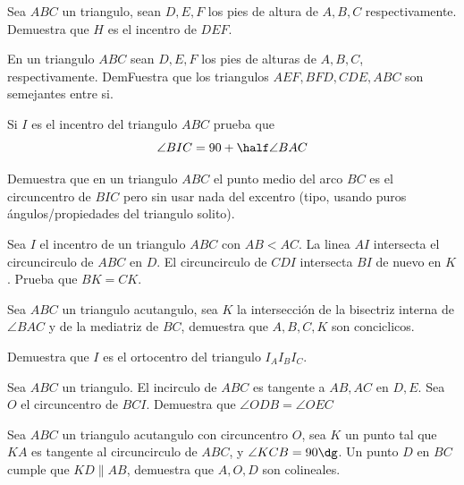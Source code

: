 \documentclass[11pt]{scrartcl}
\newcommand{\thmdifficulty}{0}
\newcommand{\problemdiff}[1]{\renewcommand{\thmdifficulty}{#1}}
\begin{document}
\problemdiff{1}
\begin{problema}
    Sea $ABC$ un triangulo, sean $D,E,F$ los pies de altura de $A,B,C$ respectivamente. Demuestra que $H$ es el incentro de $DEF$.
\end{problema}

\problemdiff{1}
\begin{problema}
    En un triangulo $ABC$ sean $D,E,F$ los pies de alturas de $A,B,C$, respectivamente. DemFuestra que los triangulos $AEF, BFD, CDE, ABC$ 
    son semejantes entre si.
\end{problema}




\problemdiff{2}
\begin{problema}
Si $I$ es el incentro del triangulo $ABC$ prueba que 
$$\angle BIC =90+\half \angle BAC$$
\end{problema}

\problemdiff{3}
\begin{problema}
Demuestra que en un triangulo $ABC$ el punto medio del arco $BC$ es el circuncentro de $BIC$ pero sin usar nada del excentro (tipo, usando puros \'angulos/propiedades del triangulo solito).
\end{problema}

\problemdiff{2}
\begin{problema}
    Sea $I$ el incentro de un triangulo $ABC$ con $AB<AC$. La linea $AI$ intersecta el circuncirculo de $ABC$ en $D$. El circuncirculo de $CDI$ intersecta $BI$ de nuevo en $K$. Prueba que $BK=CK$.
\end{problema}

\problemdiff{2}
\begin{problema}
    Sea $ABC$ un triangulo acutangulo, sea $K$ la intersecci\'on de la bisectriz interna de $\angle BAC$ y de la mediatriz de $BC$, demuestra que $A,B,C,K$ son conciclicos.
\end{problema}

\problemdiff{2}
\begin{problema}
    Demuestra que $I$ es el ortocentro del triangulo $I_AI_BI_C$.
\end{problema}


\problemdiff{3}
\begin{problema}
    Sea $ABC$ un triangulo. El incirculo de $ABC$ es tangente a $AB, AC$ en $D,E$. Sea $O$ el circuncentro de $BCI$. Demuestra que $\angle ODB=\angle OEC$
\end{problema}

\problemdiff{3.5}
\begin{problema}
    Sea $ABC$ un triangulo acutangulo con circuncentro $O$, sea $K$ un punto tal que $KA$ es tangente al circuncirculo de $ABC$, y $\angle KCB=90\dg$. Un punto $D$ en $BC$
    cumple que $KD \parallel AB$, demuestra que $A,O,D$ son colineales.
\end{problema}
\end{document}
